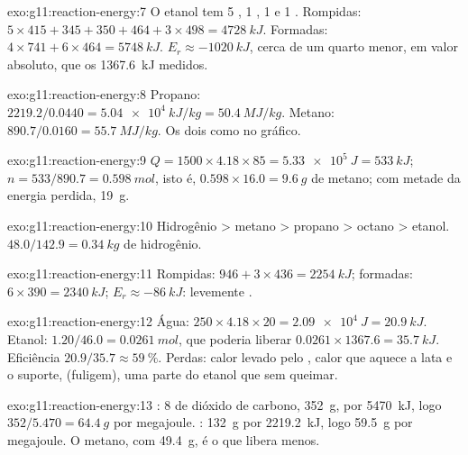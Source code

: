 \begin{solution}{exo:g11:reaction-energy:7}
O etanol  tem 5 , 1 , 1  e 1
. Rompidas: $5 \times 415 + 345 + 350 + 464 + 3 \times 498 =
\qty{4728}{kJ}$. Formadas: $4 \times 741 + 6 \times 464 = \qty{5748}{kJ}$.
$E_r \approx \qty{-1020}{kJ}$, cerca de um quarto menor, em valor
absoluto, que os \qty{1367.6}{kJ} medidos.
\end{solution}

\begin{solution}{exo:g11:reaction-energy:8}
Propano: $2219.2 / 0.0440 = \qty{5.04e4}{kJ/kg} = \qty{50.4}{MJ/kg}$.
Metano: $890.7 / 0.0160 = \qty{55.7}{MJ/kg}$. Os dois como no gráfico.
\end{solution}

\begin{solution}{exo:g11:reaction-energy:9}
$Q = 1500 \times 4.18 \times 85 = \qty{5.33e5}{J} = \qty{533}{kJ}$;
$n = 533 / 890.7 = \qty{0.598}{mol}$, isto é, $0.598 \times 16.0 =
\qty{9.6}{g}$ de metano; com metade da energia perdida, \qty{19}{g}.
\end{solution}

\begin{solution}{exo:g11:reaction-energy:10}
Hidrogênio > metano > propano > octano > etanol.
$48.0 / 142.9 = \qty{0.34}{kg}$ de hidrogênio.
\end{solution}

\begin{solution}{exo:g11:reaction-energy:11}
Rompidas: $946 + 3 \times 436 = \qty{2254}{kJ}$; formadas:
$6 \times 390 = \qty{2340}{kJ}$; $E_r \approx \qty{-86}{kJ}$: levemente
.
\end{solution}

\begin{solution}{exo:g11:reaction-energy:12}
Água: $250 \times 4.18 \times 20 = \qty{2.09e4}{J} = \qty{20.9}{kJ}$.
Etanol: $1.20 / 46.0 = \qty{0.0261}{mol}$, que poderia liberar
$0.0261 \times 1367.6 = \qty{35.7}{kJ}$. Eficiência
$20.9 / 35.7 \approx \qty{59}{\percent}$. Perdas: calor levado pelo ,
calor que aquece a lata e o suporte,  (fuligem),
uma parte do etanol que  sem queimar.
\end{solution}

\begin{solution}{exo:g11:reaction-energy:13}
: 8  de dióxido de carbono,
\qty{352}{g}, por \qty{5470}{kJ}, logo $352 / 5.470 = \qty{64.4}{g}$ por
megajoule. : \qty{132}{g} por
\qty{2219.2}{kJ}, logo \qty{59.5}{g} por megajoule. O metano, com
\qty{49.4}{g}, é o que libera menos.
\end{solution}

